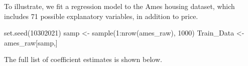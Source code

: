 \documentclass[
  letterpaper,
  DIV=11,
  numbers=noendperiod]{scrreprt}
\newenvironment{Shaded}{\begin{snugshade}}{\end{snugshade}}
\newcommand{\AttributeTok}[1]{\textcolor[rgb]{0.40,0.45,0.13}{#1}}
\newcommand{\DecValTok}[1]{\textcolor[rgb]{0.68,0.00,0.00}{#1}}
\newcommand{\FunctionTok}[1]{\textcolor[rgb]{0.28,0.35,0.67}{#1}}
\newcommand{\NormalTok}[1]{\textcolor[rgb]{0.00,0.23,0.31}{#1}}
\newcommand{\OtherTok}[1]{\textcolor[rgb]{0.00,0.23,0.31}{#1}}
\newcommand{\SpecialCharTok}[1]{\textcolor[rgb]{0.37,0.37,0.37}{#1}}
\begin{document}
To illustrate, we fit a regression model to the Ames housing dataset,
which includes 71 possible explanatory variables, in addition to price.

\begin{Shaded}
\begin{Highlighting}[]
\FunctionTok{set.seed}\NormalTok{(}\DecValTok{10302021}\NormalTok{)}
\NormalTok{samp }\OtherTok{\textless{}{-}} \FunctionTok{sample}\NormalTok{(}\DecValTok{1}\SpecialCharTok{:}\FunctionTok{nrow}\NormalTok{(ames\_raw), }\DecValTok{1000}\NormalTok{)}
\NormalTok{Train\_Data }\OtherTok{\textless{}{-}}\NormalTok{ ames\_raw[samp,]}
\end{Highlighting}
\end{Shaded}

The full list of coefficient estimates is shown below.

\begin{Shaded}
\end{Shaded}
\end{document}
